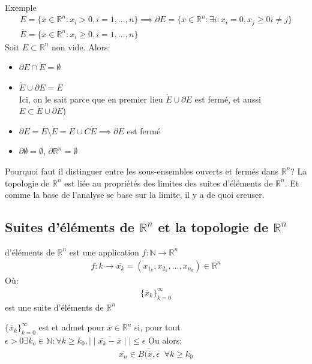 \begin{parag}{Exemple}
    \begin{align*}
        E = \{ \overline{x} \in \mathbb{R}^n  : x_i > 0, i = 1, \dots, n\} \implies \partial E = \{ \overline{x} \in \mathbb{R}^n  :  \exists i: x_i = 0, x_j \geq 0 i \neq j\} \\
        \overline{E} = \{ \overline{x} \in \mathbb{R}^n : x_i \geq 0, i = 1, \dots, n\}
    \end{align*}
Soit $E \subset \mathbb{R}^n $ non vide. Alors:
\begin{itemize}
    \item $ \partial E \cap \mathring{E} = \emptyset$
    \item $\mathring{E} \cup \partial E = \overline{E}$ \\
        Ici, on le sait parce que en premier lieu $ \mathring{E} \cup \partial E$ est fermé, et aussi $ E \subset \mathring{E} \cup \partial E$)
    \item $ \partial E = \overline{E} \setminus \mathring{E} = \overline{E} \cup C\mathring{E} \implies \partial E$ est fermé
    \item $ \partial \emptyset = \emptyset$, $ \partial \mathbb{R}^n  = \emptyset$
\end{itemize}
Pourquoi faut il distinguer entre les sous-ensembles ouverts et fermés dans $ \mathbb{R}^n $? La topologie de $ \mathbb{R}^n $ est liée au propriétés des limites des suites d'éléments de $ \mathbb{R}^n $. Et comme la base de l'analyse se base sur la limite, il y a de quoi creuser.

\end{parag}

\subsection{Suites d'éléments de $ \mathbb{R}^n $ et la topologie de $ \mathbb{R}^n $}
\begin{definition}
     d'éléments de $ \mathbb{R}^n $ est une application $ f: \mathbb{N} \to \mathbb{R}^n $ 
    \begin{align*}
        f: k \to \overline{x_k} = (x_{1_k}, x_{2_k}, \dots, x_{n_k}) \in \mathbb{R}^n 
    \end{align*}
    Où:
    \begin{align*}
        \{ \overline{x}_k\}_{k=0}^\infty
    \end{align*}
    est une suite d'éléments de $ \mathbb{R}^n $
\end{definition}
\begin{definition}
    $\{ \overline{x}_k\}_{k=0}^\infty$ est  et admet pour  $ \overline{x} \in \mathbb{R}^n $ si, pour tout $ \epsilon > 0 \exists k_o \in \mathbb{N}: \forall k \geq k_0, \mid \mid \overline{ \overline{x_k} - \overline{x}} \mid \mid \leq \epsilon$
    Ou alors:
    \begin{align*}
        \overline{x_n} \in \overline{B( \overline{x}, \epsilon} \; \; \forall k \geq k_0
    \end{align*}
    
\end{definition}

